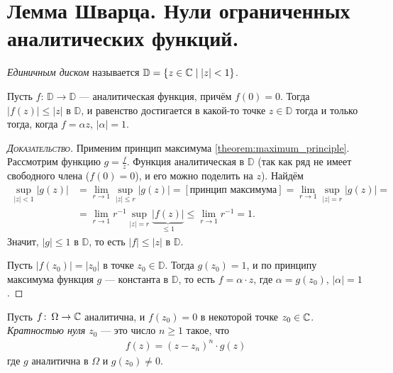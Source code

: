 \documentclass[../../main.tex]{subfiles}
\begin{document}
\newpage
\section{Лемма Шварца. Нули ограниченных аналитических функций.}

\begin{df*}
 \textit{Единичным диском} называется $ \mathbb D = \left\{ z \in \mathbb{C} \;\middle|\; \left| z \right| < 1 \right\} $.
\end{df*}

\begin{lm}[Шварца]
 Пусть $ f \colon\, \mathbb D \to \mathbb D $ --- аналитическая функция, причём $ f(0) = 0 $. Тогда $ \left| f(z) \right| \leqslant \left| z \right| $ в $ \mathbb D $, и равенство достигается в какой-то точке $ z \in \mathbb D $ тогда и только тогда, когда $f = \alpha z$, $ \left| \alpha  \right| = 1 $.
\end{lm}
\begin{proof}[\normalfont\textsc{Доказательство}]
Применим принцип максимума \eqref{theorem:maximum_principle}. Рассмотрим функцию $ g=\frac{f}{z} $. Функция аналитическая в $ \mathbb D $ (так как ряд не имеет свободного члена ($ f(0) = 0 $), и его можно поделить на $ z $). Найдём
 \begin{align*}
  \sup_{\left| z \right| < 1} \left| g(z) \right| &= \lim_{r \to 1} \sup_{\left| z \right| \leqslant r} \left| g(z) \right| = [\text{принцип максимума}] = \lim_{r\to 1} \sup_{\left| z \right| = r} \left| g(z) \right| = \\
  &= \lim_{r \to 1} r^{-1} \sup_{\left| z \right| = r} \underbrace{\left| f(z) \right|}_{\leq 1} \leqslant \lim_{r \to 1} r^{-1} = 1.
 \end{align*} Значит, $ \left| g \right| \leqslant 1 $ в $ \mathbb D $, то есть $ \left| f \right| \leqslant \left| z \right| $ в $ \mathbb D $.

 Пусть $ \left|f(z_0) \right| = \left| z_0 \right| $ в точке $ z_0 \in \mathbb D $. Тогда $ g(z_0) = 1 $, и по принципу максимума функция $ g $ --- константа в $ \mathbb D $, то есть $ f = \alpha \cdot z $, где $ \alpha = g(z_0) $, $ \left| \alpha \right|=1 $.
\end{proof}

\begin{df}
 Пусть $ f \colon\, \Omega \to \mathbb{C} $ аналитична, и $ f(z_0) = 0 $ в некоторой точке $ z_0 \in \mathbb{C} $. \textit{Кратностью нуля $ z_0 $} --- это число $ n \geqslant 1 $ такое, что
 \begin{align*}
  f(z) = (z-z_n)^{n} \cdot g(z)
 \end{align*} где $ g $ аналитична в $ \Omega $ и $ g(z_0) \neq 0 $.
\end{df}
\end{document}
